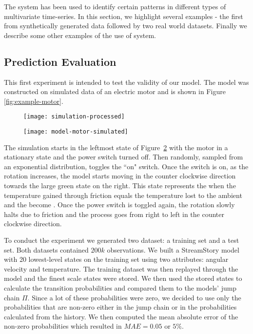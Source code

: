 The system has been used to identify certain patterns in different types of multivariate time-series. In this section, we highlight several examples - the first from synthetically generated data followed by two real world datasets. Finally we describe some other examples of the use of system.

\subsection{Prediction Evaluation}

This first experiment is intended to test the validity of our model. The model was constructed on simulated data of 
an electric motor and is shown in Figure \ref{fig:example-motor}. 
\begin{figure*}[]
  	\centering
  	\begin{subfigure}{.48\textwidth}
	  	\centering
	  	\texttt{[image: simulation-processed]}
  		\caption{\label{fig:simulation-chart}}
	\end{subfigure}
  	\begin{subfigure}{.48\textwidth}
	  	\centering
	  	\texttt{[image: model-motor-simulated]}
  		\caption{\label{fig:simulation-model}}
	\end{subfigure}
  	\caption{}
  	\label{fig:example-motor}
\end{figure*}
The simulation starts in the leftmost state of Figure~\ref{fig:simulation-model} with the motor in a stationary state
and the power switch turned off. Then  randomly, sampled from an exponential distribution,
toggles the ``on" switch. Once the switch is on, as the rotation increases, the model starts moving in the counter clockwise
direction towards the large green state on the right. This state represents the  when the temperature
gained through friction equals the temperature lost to the ambient and the  become .
Once the power switch is toggled again, the rotation slowly halts due to friction and the process goes from right to
left in the counter clockwise direction.

To conduct the experiment we generated two dataset: a training set and a test set. Both datasets
contained $200k$ observations. We built a StreamStory model with 20 lowest-level states on the training set using two attributes:
angular velocity and temperature. The training dataset was then replayed through the model and the finest scale states were stored. We then used
the stored states to calculate the transition probabilities and compared them to the models' jump chain $\Pi$. Since a lot of these probabilities were zero, we decided to use only the probabilities that
are non-zero either in the jump chain or in the probabilities calculated from the history. We then
computed the mean absolute error of the non-zero probabilities which resulted in $MAE=0.05$ or $5\%$.

